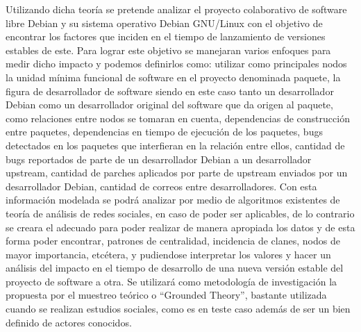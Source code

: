 \documentclass[12pt]{report}
\begin{document}
Utilizando dicha teoría se  pretende analizar el proyecto colaborativo
de software libre  Debian y su sistema operativo  Debian GNU/Linux con
el objetivo  de encontrar  los factores  que inciden  en el  tiempo de
lanzamiento de versiones estables de  este.  Para lograr este objetivo
se  manejaran  varios enfoques  para  medir  dicho impacto  y  podemos
definirlos  como: utilizar  como  principales nodos  la unidad  mínima
funcional de software en el  proyecto denominada paquete, la figura de
desarrollador de software  siendo en este caso  tanto un desarrollador
Debian como  un desarrollador original  del software que da  origen al
paquete,   como  relaciones   entre  nodos   se  tomaran   en  cuenta,
dependencias de construcción entre paquetes, dependencias en tiempo de
ejecución  de  los  paquetes,  bugs detectados  en  los  paquetes  que
interfieran en la relación entre ellos, cantidad de bugs reportados de
parte de un desarrollador Debian a un desarrollador upstream, cantidad
de  parches   aplicados  por  parte   de  upstream  enviados   por  un
desarrollador Debian, cantidad de  correos entre desarrolladores.  Con
esta información  modelada se podrá  analizar por medio  de algoritmos
existentes de teoría  de análisis de redes sociales, en  caso de poder
ser  aplicables, de  lo contrario  se  creara el  adecuado para  poder
realizar  de  manera  apropiada  los  datos  y  de  esta  forma  poder
encontrar,  patrones de  centralidad, incidencia  de clanes,  nodos de
mayor importancia,  etcétera, y  pudiendose interpretar los  valores y
hacer un análisis del impacto en  el tiempo de desarrollo de una nueva
versión estable  del proyecto de  software a otra.  Se  utilizará como
metodología de  investigación la propuesta  por el muestreo  teórico o
``Grounded Theory'',  bastante utilizada  cuando se  realizan estudios
sociales, como  es en  teste caso  además de ser  un bien  definido de
actores conocidos.
\end{document}
